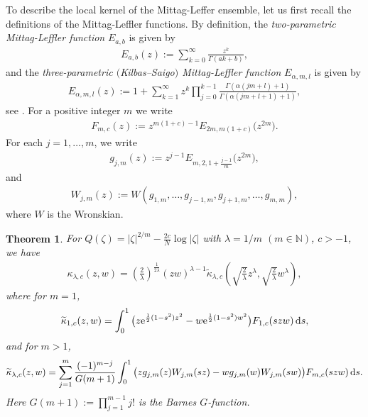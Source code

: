 \documentclass[pdftex]{sigma}
\numberwithin{equation}{section}
\newtheorem{Theorem}{Theorem}[section]
\newcommand{\1}{\chi}
\begin{document}
To describe the local kernel of the Mittag-Leffer ensemble, let us first recall the definitions of the Mittag-Leffler functions. By definition, the \emph{two-parametric Mittag-Leffler function} $E_{a,b}$ is given by
\begin{gather} \label{ML function}
	E_{a,b}(z):=\sum_{k=0}^{\infty} \frac{z^k}{\Gamma(ak+b)},
\end{gather}
and the \emph{three-parametric $($Kilbas--Saigo$)$ Mittag-Leffler function} $E_{\alpha,m,l}$ is given by
\begin{gather} \label{ML3}
	E_{\alpha,m,l}(z):=1+\sum_{k=1}^\infty z^k \prod_{j=0}^{k-1} \frac{ \Gamma(\alpha(jm+l)+1) }{ \Gamma(\alpha(jm+l+1)+1) },
\end{gather}
see \cite[Chapters~4 and~5]{gorenflo2014mittag}.
For a positive integer $m$ we write
\begin{gather}\label{F integer}
	F_{m,c}(z):=z^{m(1+c)-1} E_{2m,m(1+c)}\big(z^{2m}\big).
\end{gather}
For each $j =1,\dots,m$, we write
\begin{gather} \label{m indep sol}
g_{j,m}(z):=z^{j-1} E_{m,2,1+\frac{j-1}{m}}\big(z^{2m}\big),
\end{gather}
and
\begin{gather} \label{W_j(z)}
W_{j,m}(z):=W( g_{1,m},\dots, g_{j-1,m}, g_{j+1,m}, \dots, g_{m,m} ),
\end{gather}
where $W$ is the Wronskian.

\begin{Theorem} \label{Thm_ML integer}
	For $Q(\zeta)=|\zeta|^{2/m}-\frac{2c}{N} \log|\zeta|$ with $\lambda=1/m$ $(m\in \mathbb{N})$, $c>-1$, we have
	\begin{gather*}
		\kappa_{\lambda,c}(z,w)=\left( \frac{2}{\lambda} \right)^{ \frac{1}{2\lambda} } (zw)^{\lambda-1} \widetilde{\kappa}_{\lambda,c} \left( \sqrt{ \frac{2}{\lambda} } z^\lambda, \sqrt{ \frac{2}{\lambda} } w^\lambda \right),
	\end{gather*}
	where for $m=1$,
	\begin{gather*}
	\widetilde{\kappa}_{1,c}(z,w)= \int_0^1 \big(z {\rm e}^{ \frac12 (1-s^2)z^2 } -w {\rm e}^{ \frac12 (1-s^2)w^2 }\big)F_{1,c}(szw)\,{\rm d}s,
	\end{gather*}
	and for $m>1$,
	\begin{gather*}
	\widetilde{\kappa}_{\lambda,c}(z,w)= \sum_{j=1}^{m} \frac{(-1)^{m-j}}{G(m+1)} \int_0^1 \big( z g_{j,m}(z)W_{j,m}(sz)-w g_{j,m}(w)W_{j,m}(sw)\big)F_{m,c}(szw)\,{\rm d}s.
	\end{gather*}
	Here $G(m+1):=\prod_{j=1}^{m-1} j!$ is the Barnes $G$-function.
\end{Theorem}
\end{document}
